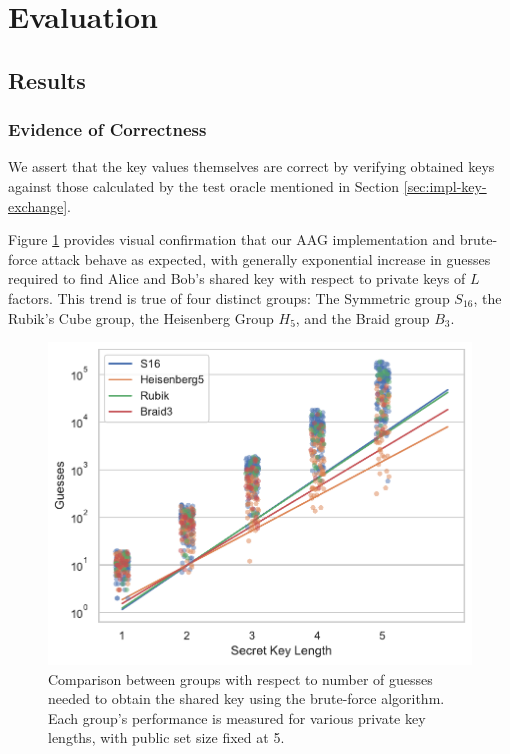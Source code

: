 \section{Evaluation}
\label{sec:eval}

\subsection{Results}

\subsubsection{Evidence of Correctness}

We assert that the key values themselves are correct by verifying obtained keys against those calculated by the test oracle mentioned in Section \ref{sec:impl-key-exchange}.

Figure \ref{fig:guess-l} provides visual confirmation that our AAG implementation and brute-force attack behave as expected, with generally exponential increase in guesses required to find Alice and Bob's shared key with respect to private keys of $L$ factors. This trend is true of four distinct groups: The Symmetric group $S_{16}$, the Rubik's Cube group, the Heisenberg Group $H_5$, and the Braid group $B_3$.

\begin{figure}[hbt]
  \includegraphics[width=\columnwidth]{images/Guesses-L.pdf}
  \caption{Comparison between groups with respect to number of guesses needed to obtain the shared key using the brute-force algorithm. Each group's performance is measured for various private key lengths, with public set size fixed at 5.}
  \label{fig:guess-l}
\end{figure}

